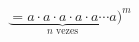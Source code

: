 \documentclass[preview]{standalone}
\begin{document}
\begin{align*}
\underbrace{=a \cdot a \cdot a \cdot a \cdot a \cdots a}_{n \text{ vezes}})^m
\end{align*}
\end{document}
